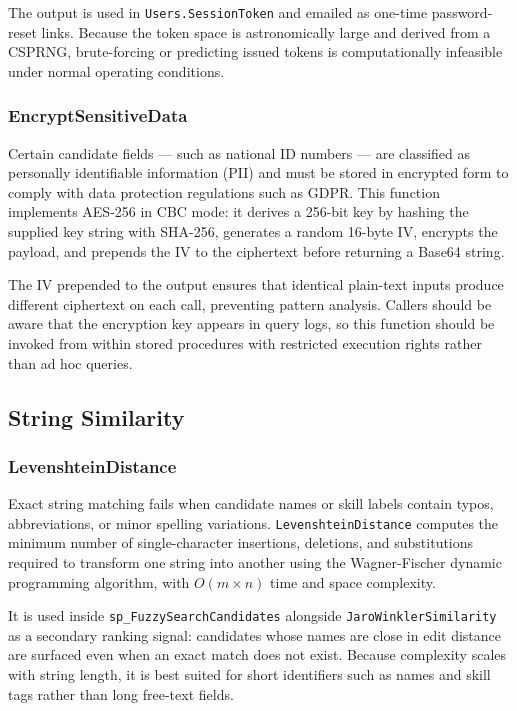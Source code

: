 \documentclass[11pt,a4paper]{article}
\begin{document}
The output is used in \texttt{Users.SessionToken} and emailed as one-time password-reset links. Because the token space is astronomically large and derived from a CSPRNG, brute-forcing or predicting issued tokens is computationally infeasible under normal operating conditions.

\subsubsection{EncryptSensitiveData}
\noindent
Certain candidate fields --- such as national ID numbers --- are classified as personally identifiable information (PII) and must be stored in encrypted form to comply with data protection regulations such as GDPR. This function implements AES-256 in CBC mode: it derives a 256-bit key by hashing the supplied key string with SHA-256, generates a random 16-byte IV, encrypts the payload, and prepends the IV to the ciphertext before returning a Base64 string.

The IV prepended to the output ensures that identical plain-text inputs produce different ciphertext on each call, preventing pattern analysis. Callers should be aware that the encryption key appears in query logs, so this function should be invoked from within stored procedures with restricted execution rights rather than ad hoc queries.

\subsection{String Similarity}

\subsubsection{LevenshteinDistance}
\noindent
Exact string matching fails when candidate names or skill labels contain typos, abbreviations, or minor spelling variations. \texttt{LevenshteinDistance} computes the minimum number of single-character insertions, deletions, and substitutions required to transform one string into another using the Wagner-Fischer dynamic programming algorithm, with $O(m \times n)$ time and space complexity.

It is used inside \texttt{sp\_FuzzySearchCandidates} alongside \texttt{JaroWinklerSimilarity} as a secondary ranking signal: candidates whose names are close in edit distance are surfaced even when an exact match does not exist. Because complexity scales with string length, it is best suited for short identifiers such as names and skill tags rather than long free-text fields.
\end{document}
